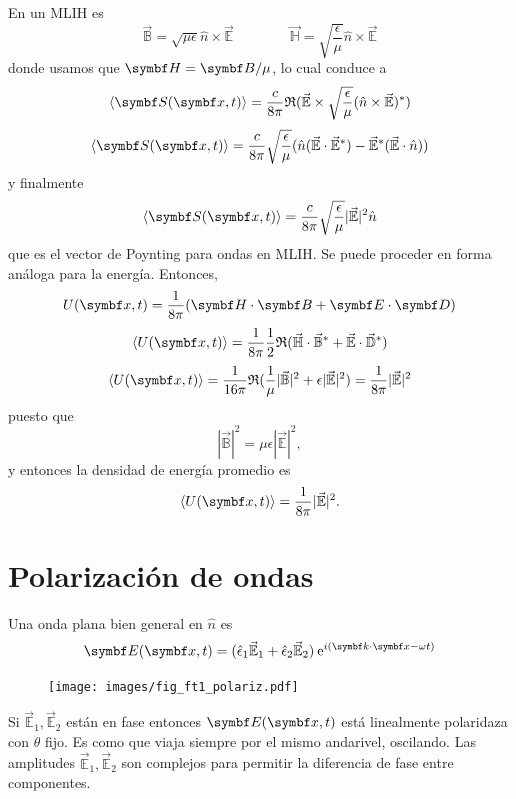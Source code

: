 \documentclass[10pt,oneside]{CBFT_book}
\begin{document}
En un MLIH es 
\[
	\vec{\mathbb{B}} = \sqrt{ \mu \epsilon } \hat{n} \times \vec{\mathbb{E}} \qquad\qquad 
	\vec{\mathbb{H}} = \sqrt{ \frac{\epsilon}{\mu } } \hat{n} \times \vec{\mathbb{E}}
\]
donde usamos que $\vb{H} = \vb{B}/\mu$, lo cual conduce a
\[
	\langle \vb{S}( \vb{x},t ) \rangle = \frac{c}{8\pi} \re( \vec{\mathbb{E}} \times 
		\sqrt{\frac{\epsilon}{\mu}}(\hat{n} \times \vec{\mathbb{E}})^* )
\]
\[
	\langle \vb{S}( \vb{x},t ) \rangle = \frac{c}{8\pi} \sqrt{\frac{\epsilon}{\mu}} 
		( \hat{n} (\vec{\mathbb{E}}\cdot\vec{\mathbb{E}}^*) - 
		\vec{\mathbb{E}}^*(\vec{\mathbb{E}}\cdot\hat{n}) )
\]
y finalmente
\[
	\langle \vb{S}( \vb{x},t ) \rangle = \frac{c}{8\pi} 
		\sqrt{\frac{\epsilon}{\mu}}|\vec{\mathbb{E}}|^2 \hat{n}
\]
que es el vector de Poynting para ondas en MLIH.
Se puede proceder en forma análoga para la energía. Entonces,
\[
	U(\vb{x},t) = \frac{1}{8\pi}( \pe{H}{B} + \pe{E}{D} )
\]
\[
	\langle U(\vb{x},t) \rangle = \frac{1}{8\pi} \frac{1}{2} \re ( 
	\vec{\mathbb{H}}\cdot\vec{\mathbb{B}}^* + \vec{\mathbb{E}}\cdot\vec{\mathbb{D}}^* )
\]
\[
	\langle U(\vb{x},t) \rangle = \frac{1}{16\pi}
		\re ( \frac{1}{\mu} |\vec{\mathbb{B}}|^2 + \epsilon |\vec{\mathbb{E}}|^2 ) =
		\frac{1}{8\pi} |\vec{\mathbb{E}}|^2
\]
puesto que 
\[
	|\vec{\mathbb{B}}|^2 = \mu\epsilon |\vec{\mathbb{E}}|^2,	
\]
y entonces la densidad de energía promedio es
\[
		\langle U(\vb{x},t) \rangle = \frac{1}{8\pi} |\vec{\mathbb{E}}|^2.
\]

\section{Polarización de ondas}

Una onda plana bien general en $\hat{n}$ es 
\[
	\vb{E}( \vb{x},t )=(\hat{\epsilon}_1 \vec{\mathbb{E}}_1 + 
			\hat{\epsilon}_2\vec{\mathbb{E}}_2) \euler^{i( \pe{k}{x} -\omega t)}
\]

\begin{figure}[htb]
	\begin{center}
	\texttt{[image: images/fig\_ft1\_polariz.pdf]}	 
	\end{center}
	\caption{}
\end{figure} 

Si $\vec{\mathbb{E}}_1,\vec{\mathbb{E}}_2$ están en fase entonces $\vb{E}( \vb{x},t )$ está linealmente
polaridaza con $\theta$ fijo.
Es como que  viaja siempre por el mismo andarivel, oscilando. Las amplitudes 
$\vec{\mathbb{E}}_1,\vec{\mathbb{E}}_2$ son complejos para permitir la diferencia de fase entre componentes.
\end{document}
